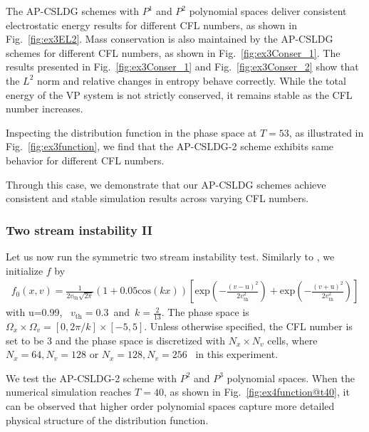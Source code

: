 \documentclass[letterpaper,10pt]{article}
\numberwithin{equation}{section}
\numberwithin{figure}{section}
\numberwithin{table}{section}
\begin{document}
The AP-CSLDG schemes with $P^1$ and $P^2$ polynomial spaces deliver consistent electrostatic energy results for different CFL numbers, as shown in Fig.~\ref{fig:ex3EL2}.
Mass conservation is also maintained by the AP-CSLDG schemes for different CFL numbers, as shown in Fig.~\ref{fig:ex3Conser_1}. The results presented in
Fig.~\ref{fig:ex3Conser_1} and Fig.~\ref{fig:ex3Conser_2} show that the $L^2$ norm and relative changes in entropy behave correctly. 
While the total energy of the VP system is not strictly conserved, it remains stable as the CFL number increases.

Inspecting the distribution function in the phase space at $T=53$, as illustrated in Fig.~\ref{fig:ex3function}, we find that the AP-CSLDG-2 scheme exhibits same behavior for different CFL numbers.

Through this case, we demonstrate that our AP-CSLDG schemes achieve consistent and stable simulation results across varying CFL numbers.

\subsubsection{Two stream instability II}
\hspace{4pt}

Let us now run the symmetric two stream instability test. Similarly to  \cite{CROUSEILLES2010}, we initialize $f$ by
\begin{align}\label{Instability2}
    f_0(x,v)=\frac{1}{2v_{\text{th}}\sqrt{2\pi}}\left(1+0.05\text{cos}(kx)\right)\left[\text{exp}\left(-\frac{(v-\text{u})^2}{2v^2_{\text{th}}}\right)+\text{exp}\left(-\frac{(v+\text{u})^2}{2v^2_{\text{th}}}\right)\right]
\end{align}
with u=0.99, ~$v_{\text{th}}=0.3$~and~$k=\frac{2}{13}$. 
The phase space is $\Omega_x\times\Omega_v = [0,2\pi/k]\times[-5,5]$. 
Unless otherwise specified, the CFL number is set to be 3 and the phase space is discretized with $N_x\times N_v$ cells, where ~$N_x=64,N_v=128$ or $N_x=128,N_v=256$~ in this experiment.

We test the AP-CSLDG-2 scheme with $P^2$ and $P^3$ polynomial spaces. 
When the numerical simulation reaches $T=40$, as shown in Fig.~\ref{fig:ex4function@t40}, it can be observed that higher order polynomial spaces capture more detailed physical structure of the distribution function. 

\end{document}
